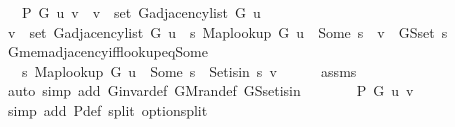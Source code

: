 \begin{isabellebody}
\ \ \ {\isachardoublequoteopen}P\ G\ u\ v\ {\isasymlongleftrightarrow}\ v\ {\isasymin}\ set\ {\isacharparenleft}{\kern0pt}G{\isachardot}{\kern0pt}adjacency{\isacharunderscore}{\kern0pt}list\ G\ u{\isacharparenright}{\kern0pt}{\isachardoublequoteclose}\isanewline
%
\isadelimproof
%
\endisadelimproof
%
\isatagproof
{}\isamarkupfalse%
\ {\isacharminus}{\kern0pt}\isanewline
\ \ \isamarkupfalse%
\ {\isachardoublequoteopen}v\ {\isasymin}\ set\ {\isacharparenleft}{\kern0pt}G{\isachardot}{\kern0pt}adjacency{\isacharunderscore}{\kern0pt}list\ G\ u{\isacharparenright}{\kern0pt}\ {\isasymlongleftrightarrow}\ {\isacharparenleft}{\kern0pt}{\isasymexists}s{\isachardot}{\kern0pt}\ Map{\isacharunderscore}{\kern0pt}lookup\ G\ u\ {\isacharequal}{\kern0pt}\ Some\ s\ {\isasymand}\ v\ {\isasymin}\ G{\isachardot}{\kern0pt}S{\isachardot}{\kern0pt}set\ s{\isacharparenright}{\kern0pt}{\isachardoublequoteclose}\isanewline
\ \ \ \ \isamarkupfalse%
\ G{\isachardot}{\kern0pt}mem{\isacharunderscore}{\kern0pt}adjacency{\isacharunderscore}{\kern0pt}iff{\isacharunderscore}{\kern0pt}lookup{\isacharunderscore}{\kern0pt}eq{\isacharunderscore}{\kern0pt}Some\isanewline
\ \ \ \ \isacommand{{\isachardot}{\kern0pt}}\isamarkupfalse%
\isanewline
\ \ \isamarkupfalse%
\ \isamarkupfalse%
\ {\isachardoublequoteopen}{\isachardot}{\kern0pt}{\isachardot}{\kern0pt}{\isachardot}{\kern0pt}\ {\isasymlongleftrightarrow}\ {\isacharparenleft}{\kern0pt}{\isasymexists}s{\isachardot}{\kern0pt}\ Map{\isacharunderscore}{\kern0pt}lookup\ G\ u\ {\isacharequal}{\kern0pt}\ Some\ s\ {\isasymand}\ Set{\isacharunderscore}{\kern0pt}isin\ s\ v{\isacharparenright}{\kern0pt}{\isachardoublequoteclose}\isanewline
\ \ \ \ \isamarkupfalse%
\ assms\isanewline
\ \ \ \ \isamarkupfalse%
\ {\isacharparenleft}{\kern0pt}auto\ simp\ add{\isacharcolon}{\kern0pt}\ G{\isachardot}{\kern0pt}invar{\isacharunderscore}{\kern0pt}def\ G{\isachardot}{\kern0pt}M{\isachardot}{\kern0pt}ran{\isacharunderscore}{\kern0pt}def\ G{\isachardot}{\kern0pt}S{\isachardot}{\kern0pt}set{\isacharunderscore}{\kern0pt}isin{\isacharparenright}{\kern0pt}\isanewline
\ \ \isamarkupfalse%
\ \isamarkupfalse%
\ {\isachardoublequoteopen}{\isachardot}{\kern0pt}{\isachardot}{\kern0pt}{\isachardot}{\kern0pt}\ {\isasymlongleftrightarrow}\ P\ G\ u\ v{\isachardoublequoteclose}\isanewline
\ \ \ \ \isamarkupfalse%
\ {\isacharparenleft}{\kern0pt}simp\ add{\isacharcolon}{\kern0pt}\ P{\isacharunderscore}{\kern0pt}def\ split{\isacharcolon}{\kern0pt}\ option{\isachardot}{\kern0pt}split{\isacharparenright}{\kern0pt}\isanewline

\end{isabellebody}
